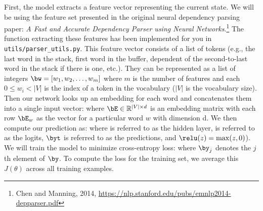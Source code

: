 \begin{parts}
    First, the model extracts a feature vector representing the current state. We will be using the feature set presented in the original neural dependency parsing paper: {\it A Fast and Accurate Dependency Parser using Neural Networks}.\footnote{Chen and Manning, 2014, \url{https://nlp.stanford.edu/pubs/emnlp2014-depparser.pdf}} The function extracting these features has been implemented for you in \texttt{utils/parser\_utils.py}. This feature vector consists of a list of tokens (e.g., the last word in the stack, first word in the buffer, dependent of the second-to-last word in the stack if there is one, etc.). They can be represented as a list of integers $\bw = [w_1, w_2, \dots, w_m]$ where $m$ is the number of features and each $0 \leq w_i < |V|$ is the index of a token in the vocabulary ($|V|$ is the vocabulary size). Then our network looks up an embedding for each word and concatenates them into a single input vector:
    where $\bE \in \mathbb{R}^{|V| \times d}$ is an embedding matrix with each row $\bE_w$ as the vector for a particular word $w$ with dimension d. We then compute our prediction as:
    where \bh \space is referred to as the hidden layer, \bl \space is referred to as the logits, $\byt$ \space is referred to as the predictions, and $\relu(z) = \max(z, 0)$). We will train the model to minimize cross-entropy loss:
     where $\by_j$ denotes the $j$th element of $\by$.
    To compute the loss for the training set, we average this $J(\theta)$ across all training examples.
    
    \begin{enumerate}[label=\roman*.]
    

\end{enumerate}
\end{parts}
